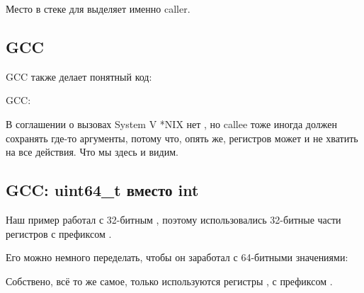 Место в стеке для  выделяет именно \gls{caller}.

\subsection{GCC}

\Optimizing GCC также делает понятный код:



\NonOptimizing GCC:



В соглашении о вызовах System V *NIX\cite{SysVABI} нет , но \gls{callee} тоже иногда
должен сохранять где-то аргументы, потому что, опять же, регистров может и не хватить на все действия.
Что мы здесь и видим.

\subsection{GCC: uint64\_t вместо int}

Наш пример работал с 32-битным \Tint, поэтому использовались 32-битные части регистров с префиксом .

Его можно немного переделать, чтобы он заработал с 64-битными значениями:





Собствено, всё то же самое, только используются регистры , с префиксом .

